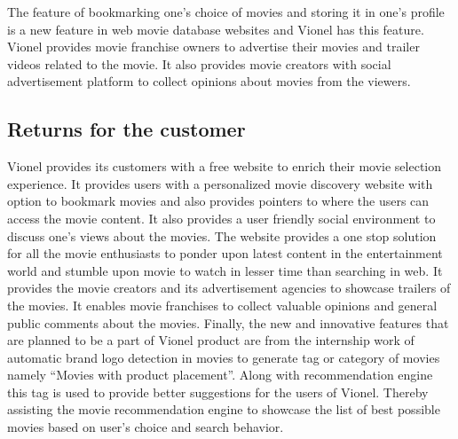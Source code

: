   The feature of bookmarking one's choice of movies and storing it in one's profile is a new feature in web movie database websites and Vionel has this feature. Vionel provides movie franchise owners to advertise their movies and trailer videos related to the movie. It also provides movie creators with social advertisement platform to collect opinions about movies from the viewers.      	   
   
  \subsection{Returns for the customer}
  \label{sub:Returns for the customer}

  Vionel provides its customers with a free website to enrich their movie selection experience. It provides users with a personalized movie discovery website with option to bookmark movies and also provides pointers to where the users can access the movie content. It also provides a user friendly social environment to discuss one's views about the movies. The website provides a one stop solution for all the movie enthusiasts to ponder upon latest content in the entertainment world and stumble upon movie to watch in lesser time than searching in web. It provides the movie creators and its advertisement agencies to showcase trailers of the movies. It enables movie franchises to collect valuable opinions and general public comments about the movies. Finally, the new and innovative features that are planned to be a part of Vionel product are from the internship work of automatic brand logo detection in movies to generate tag or category of movies namely ``Movies with product placement''. Along with recommendation engine this tag is used to provide better suggestions for the users of Vionel. Thereby assisting the movie recommendation engine to showcase the list of best possible movies based on user's choice and search behavior.      
 
